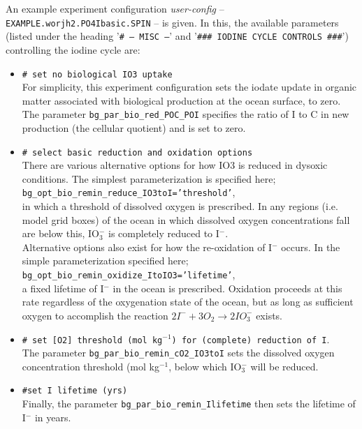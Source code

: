 \documentclass[11pt,fleqn]{book} %
\begin{document}
\noindent An example experiment configuration \textit{user-config} -- \texttt{EXAMPLE.worjh2.PO4Ibasic.SPIN} -- is given. In this, the available parameters (listed under the heading '\texttt{\# --- MISC ---}' and '\texttt{\#\#\# IODINE CYCLE CONTROLS \#\#\#}') controlling the iodine cycle are:

\begin{itemize}[noitemsep]

\vspace{1mm}
        \item \texttt{\# set no biological IO3 uptake}
        \\ For simplicity, this experiment configuration sets the iodate update in organic matter associated with biological production at the ocean surface, to zero. The parameter \texttt{bg\_par\_bio\_red\_POC\_POI} specifies the ratio of I to C in new production (the cellular quotient) and is set to zero.

\vspace{1mm}
        \item \texttt{\# select basic reduction and oxidation options}
        \\ There are various alternative options for how IO3 is reduced in dysoxic conditions. The simplest parameterization is specified here;
\\ \texttt{bg\_opt\_bio\_remin\_reduce\_IO3toI='threshold'},
\\ in which a threshold of dissolved oxygen is prescribed. In any regions (i.e. model grid boxes) of the ocean in which dissolved oxygen concentrations fall are below this, IO\(^{-}_{3}\) is completely reduced to I\(^{-}\).
\\ Alternative options also exist for how the re-oxidation of I\(^{-}\) occurs. In the simple parameterization specified here;
\\ \texttt{bg\_opt\_bio\_remin\_oxidize\_ItoIO3='lifetime'},
\\ a fixed lifetime of I\(^{-}\) in the ocean is prescribed. Oxidation proceeds at this rate regardless of the oxygenation state of the ocean, but as long as sufficient oxygen to accomplish the reaction \(2I^{-} + 3O_{2} \rightarrow 2IO^{-}_{3}\) exists.

\vspace{1mm}
        \item \texttt{\# set [O2] threshold (mol kg\(^{-1}\)) for (complete) reduction of I}.
\\ The parameter \texttt{bg\_par\_bio\_remin\_cO2\_IO3toI} sets the dissolved oxygen concentration threshold (mol kg\(^{-1}\), below which IO\(^{-}_{3}\) will be reduced.

\vspace{1mm}
        \item \texttt{\#set I lifetime (yrs)}
        \\ Finally, the parameter \texttt{bg\_par\_bio\_remin\_Ilifetime} then sets the lifetime of I\(^{-}\) in years.

\end{itemize}
\vspace{1mm}
\end{document}
